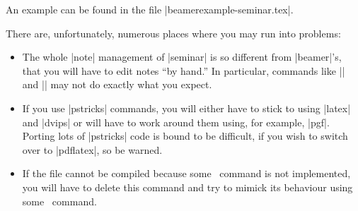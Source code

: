An example can be found in the file |beamerexample-seminar.tex|.

There are, unfortunately, numerous places where you may run into problems:
\begin{itemize}
  \item
  The whole |note| management of |seminar| is so different from |beamer|'s, that you will have to edit notes ``by hand.'' In particular, commands like |\ifslidesonly| and |\ifslide| may not do exactly what you expect.
  \item
  If you use |pstricks| commands, you will either have to stick to using |latex| and |dvips| or will have to work around them using, for example, |pgf|. Porting lots of |pstricks| code is bound to be difficult, if you wish to switch over to |pdflatex|, so be warned.
  \item
  If the file cannot be compiled because some \seminar\ command is not implemented, you will have to delete this command and try to mimick its behaviour using some \beamer\ command.
\end{itemize}

